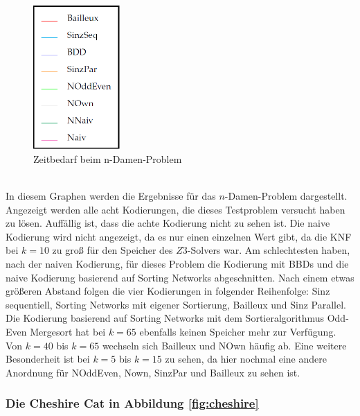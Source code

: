 \documentclass[a4,abstract=on]{scrartcl}
\begin{document}
\begin{figure}[htbp]
\includegraphics[width=3.3cm]{Legende.png}
\caption{Zeitbedarf beim n-Damen-Problem}
\label{fig:damen}
\end{figure}
\ \\
In diesem Graphen werden die Ergebnisse für das $n$-Damen-Problem dargestellt. Angezeigt werden alle acht Kodierungen, die dieses Testproblem versucht haben zu lösen. Auffällig ist, dass die achte Kodierung nicht zu sehen ist. Die naive Kodierung wird nicht angezeigt, da es nur einen einzelnen Wert gibt, da die KNF bei $k=10$ zu groß für den Speicher des $Z3$-Solvers war. Am schlechtesten haben, nach der naiven Kodierung, für dieses Problem die Kodierung mit BBDs und die naive Kodierung basierend auf Sorting Networks abgeschnitten. Nach einem etwas größeren Abstand folgen die vier Kodierungen in folgender Reihenfolge: Sinz sequentiell, Sorting Networks mit eigener Sortierung, Bailleux und Sinz Parallel. Die Kodierung basierend auf Sorting Networks mit dem Sortieralgorithmus Odd-Even Mergesort hat bei $k=65$ ebenfalls keinen Speicher mehr zur Verfügung. Von $k=40$ bis $k=65$ wechseln sich Bailleux und NOwn häufig ab. Eine weitere Besonderheit ist bei $k=5$ bis $k=15$ zu sehen, da hier nochmal eine andere Anordnung für NOddEven, Nown, SinzPar und Bailleux zu sehen ist. 

\subsubsection*{Die Cheshire Cat in Abbildung \ref{fig:cheshire}}
\end{document}
